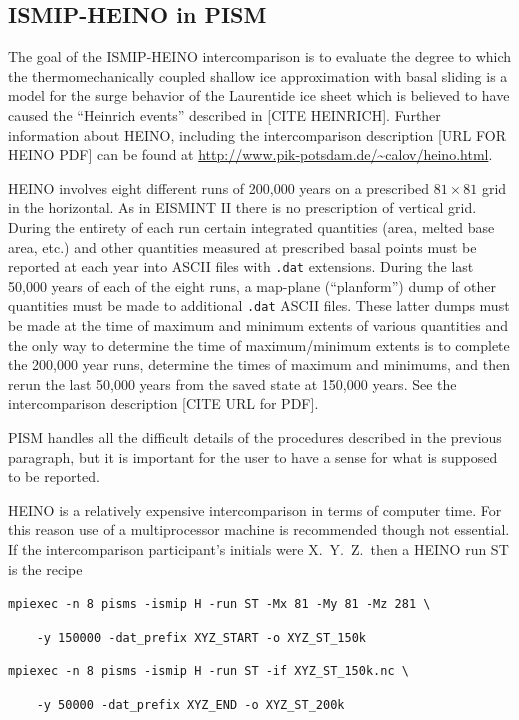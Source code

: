 \documentclass[12pt,final]{amsart}
\begin{document}
\subsection{ISMIP-HEINO in PISM}  The goal of the ISMIP-HEINO intercomparison is to evaluate the degree to which the thermomechanically coupled shallow ice approximation with basal sliding is a model for the surge behavior of the Laurentide ice sheet which is believed to have caused the ``Heinrich events'' described in [CITE HEINRICH].  Further information about HEINO, including the intercomparison description [URL FOR HEINO PDF] can be found at \url{http://www.pik-potsdam.de/~calov/heino.html}.

HEINO involves eight different runs of 200,000 years on a prescribed $81\times 81$ grid in the horizontal.  As in EISMINT II there is no prescription of vertical grid.  During the entirety of each run certain integrated quantities (area, melted base area, etc.) and other quantities measured at prescribed basal points must be reported at each year into ASCII files with \verb|.dat| extensions.  During the last 50,000 years of each of the eight runs, a map-plane (``planform'') dump of other quantities must be made to additional \verb|.dat| ASCII files.  These latter dumps must be made at the time of maximum and minimum extents of various quantities and the only way to determine the time of maximum/minimum extents is to complete the 200,000 year runs, determine the times of maximum and minimums, and then rerun the last 50,000 years from the saved state at 150,000 years.  See the intercomparison description [CITE URL for PDF].

PISM handles all the difficult details of the procedures described in the previous paragraph, but it is important for the user to have a sense for what is supposed to be reported.

HEINO is a relatively expensive intercomparison in terms of computer time.  For this reason use of a multiprocessor machine is recommended though not essential.  If the intercomparison participant's initials were X.~Y.~Z.~then a HEINO run ST is the recipe

\verb|mpiexec -n 8 pisms -ismip H -run ST -Mx 81 -My 81 -Mz 281 \|

\verb|    -y 150000 -dat_prefix XYZ_START -o XYZ_ST_150k|

\verb|mpiexec -n 8 pisms -ismip H -run ST -if XYZ_ST_150k.nc \|

\verb|    -y 50000 -dat_prefix XYZ_END -o XYZ_ST_200k|
\end{document}

